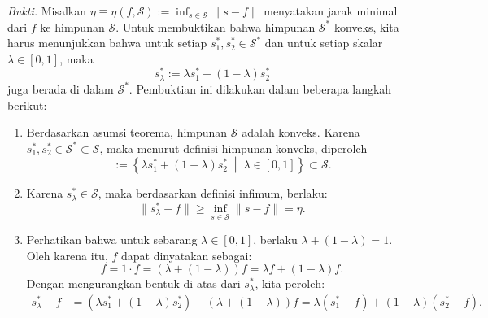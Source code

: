 \documentclass[aspectratio=169,11pt]{beamer}
\theoremstyle{definition}
\begin{document}
\begin{frame}[allowframebreaks]{\insertsection}{\insertsubsection}
  \textit{Bukti.}
  Misalkan $\eta \equiv \eta(f, \mathcal{S}) := \displaystyle \inf_{s \in \mathcal{S}} \|s - f\|$ menyatakan jarak minimal dari $f$ ke himpunan $\mathcal{S}$.
  Untuk membuktikan bahwa himpunan $\mathcal{S}^*$ konveks, kita harus menunjukkan bahwa untuk setiap $s_1^*, s_2^* \in \mathcal{S}^*$ dan untuk setiap skalar $\lambda \in [0,1]$, maka
  \setcounter{equation}{10}
  \begin{equation}
    s_\lambda^* := \lambda s_1^* + (1 - \lambda) s_2^* \label{eq:3.11}
  \end{equation}
  juga berada di dalam $\mathcal{S}^*$. Pembuktian ini dilakukan dalam beberapa langkah berikut:

  \begin{enumerate}
    \item Berdasarkan asumsi teorema, himpunan $\mathcal{S}$ adalah konveks. Karena $s_1^*, s_2^* \in \mathcal{S}^* \subset \mathcal{S}$, maka menurut definisi himpunan konveks, diperoleh
          \begin{equation*}
            [s_1^*, s_2^*] := \left\{ \lambda s_1^* + (1 - \lambda) s_2^* \;\middle|\; \lambda \in [0,1] \right\} \subset \mathcal{S}.
          \end{equation*}
    \item Karena $s_\lambda^* \in \mathcal{S}$, maka berdasarkan definisi infimum, berlaku:
          \begin{equation*}
            \|s_\lambda^* - f\| \geq \inf_{s \in \mathcal{S}} \|s - f\| = \eta.
          \end{equation*}
    \item Perhatikan bahwa untuk sebarang $\lambda \in [0,1]$, berlaku $\lambda + (1 - \lambda) = 1$. Oleh karena itu, $f$ dapat dinyatakan sebagai:
          \begin{equation*}
            f = 1 \cdot f = \left( \lambda + (1 - \lambda) \right) f = \lambda f + (1 - \lambda) f.
          \end{equation*}
          Dengan mengurangkan bentuk di atas dari $s_\lambda^*$, kita peroleh:
          \begin{align*}
            s_\lambda^* - f & = \left( \lambda s_1^* + (1 - \lambda) s_2^* \right) - \left( \lambda + (1 - \lambda) \right) f = \lambda (s_1^* - f) + (1 - \lambda) (s_2^* - f).
          \end{align*}


\end{enumerate}
\end{frame}
\end{document}
